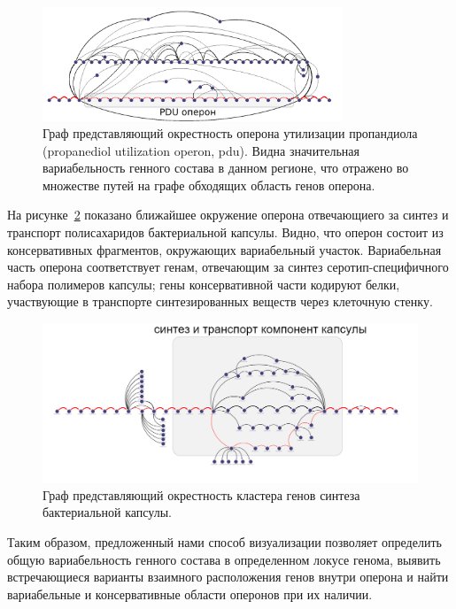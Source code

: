 \begin{figure}[!ht] 
  \center
    \includegraphics[width=0.8\textwidth]{Dissertation/images/subgraphs/pdu_laconic.png}
  \caption{Граф представляющий окрестность оперона утилизации пропандиола (propanediol utilization operon, pdu). Видна значительная вариабельность генного состава в данном регионе, что отражено во множестве путей на графе обходящих область генов оперона.}
  \label{img:sub_pdu} 
\end{figure}

На рисунке~\ref{img:capsule_sub_small} показано ближайшее окружение оперона отвечающиего за синтез и транспорт полисахаридов бактериальной капсулы. Видно, что оперон состоит из консервативных фрагментов, окружающих вариабельный участок. Вариабельная часть оперона соответствует генам, отвечающим за синтез серотип-специфичного набора полимеров капсулы; гены консервативной части кодируют белки, участвующие в транспорте синтезированных веществ через клеточную стенку.


\begin{figure}[!ht] 
  \center
    \includegraphics[width=\textwidth]{Dissertation/images/subgraphs/capsular_subgraph.png}
  \caption{Граф представляющий окрестность кластера генов синтеза бактериальной капсулы. }
  \label{img:capsule_sub_small} 
\end{figure}


Таким образом, предложенный нами способ визуализации позволяет определить общую вариабельность генного состава в определенном локусе генома, выявить встречающиеся варианты взаимного расположения генов внутри оперона и найти вариабельные и консервативные области оперонов при их наличии.

